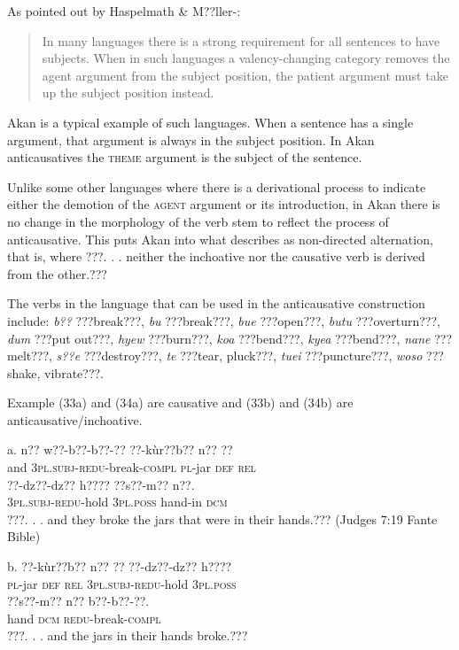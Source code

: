 \documentclass[output=paper]{langsci/langscibook}
\begin{document}
As pointed out by Haspelmath \& M??ller-\citet[1132]{Bardey2004}: 

\begin{quote}
In many languages there is a strong requirement for all sentences to have subjects. When in such languages a valency-changing category removes the agent argument from the subject position, the patient argument must take up the subject position instead.
\end{quote}

Akan is a typical example of such languages. When a sentence has a single argument, that argument is always in the subject position. In Akan anticausatives the \textsc{theme} argument is the subject of the sentence. 

Unlike some other languages where there is a derivational process to indicate either the demotion of the \textsc{agent} argument or its introduction, in Akan there is no change in the morphology of the verb stem to reflect the process of anticausative. This puts Akan into what \citet[91]{Haspelmath1993} describes as non-directed alternation, that is, where ???. . . neither the inchoative nor the causative verb is derived from the other.???

The verbs in the language that can be used in the anticausative construction include: \emph{b??} ???break???, \emph{bu} ???break???, \emph{bue} ???open???, \emph{butu} ???overturn???, \emph{dum} ???put out???, \emph{hyew} ???burn???, \emph{koa} ???bend???, \emph{kyea} ???bend???, \emph{nane} ???melt???, \emph{s??e} ???destroy???, \emph{te} ???tear, pluck???, \emph{tuei} ???puncture???, \emph{woso} ???shake, vibrate???. 

Example (33a) and (34a) are causative and (33b) and (34b) are anticausative/inchoative.

\ea
\gll a.  n??  w??-b??-b??-??       ??-k\`{u}r??b??   n??  ?? \\
       and  \textsc{3pl.subj}{}-\textsc{redu}{}-break\textsc{{}-compl}  \textsc{pl}{}-jar    \textsc{def}  \textsc{rel}  \\
\gll   ??{}-dz??-dz??    h????    ??s??-m??    n??.   \\
             \textsc{3pl.subj}{}-\textsc{redu}{}-hold  \textsc{3pl.poss}  hand-in  \textsc{dcm}\\
\glt ???. . .  and they broke the jars that were in their hands.??? (Judges 7:19 Fante Bible)
\z

\ea
\gll  b.  ??-k\`{u}r??b??   n??  ??  ??{}-dz??-dz??    h????  \\
       \textsc{pl}{}-jar    \textsc{def}  \textsc{rel}  \textsc{3pl.subj}{}-\textsc{redu}{}-hold  \textsc{3pl.poss}\\
\gll   ??s??-m??    n??    b??-b??-??.\\
       hand    \textsc{dcm}    \textsc{redu}{}-break-\textsc{compl}\\
\glt ???. . .  and the jars in their hands broke.???
\z
\end{document}
